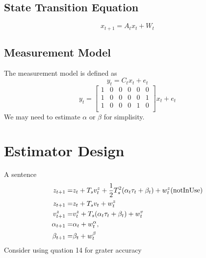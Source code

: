\documentclass{article}
\begin{document}
\subsection{State Transition Equation}
\begin{equation}
    {x}_{t+1} = A_t {x}_t + W_t
\end{equation}

\subsection{Measurement Model}
The measurement model is defined as
\begin{equation}
y_t = C_t x_t + e_t
\end{equation}
\begin{equation}
    y_t  = 
    \begin{bmatrix}
        1 & 0 & 0 & 0 & 0 & 0 \\
        1 & 0 & 0 & 0 & 0 & 1 \\
        1 & 0 & 0 & 0 & 1 & 0 \\
    \end{bmatrix}
        x_t + e_t
\end{equation}
We may need to estimate \(\alpha\) or \(\beta\) for simplisity.

\section{Estimator Design}
A sentence
\begin{align}
    z_{t+1} =& z_t + T_s v_t^z + \frac{1}{2} T_s^2 (\alpha_t \tau_t + \beta_t) + w_t^z (\rm not In Use)\\
    z_{t+1} =& z_t + {T_s}{v_t} + w^{z}_{t}\\
    v_{t+1}^z =& v_t^z + T_s (\alpha_t \tau_t + \beta_t) + w_t^v\\
    \alpha_{t+1} =& \alpha_t + w_t^\alpha,\\
    \beta_{t+1} =& \beta_t + w_t^\beta\\
\end{align}
Consider using quation 14 for grater accuracy
\end{document}
